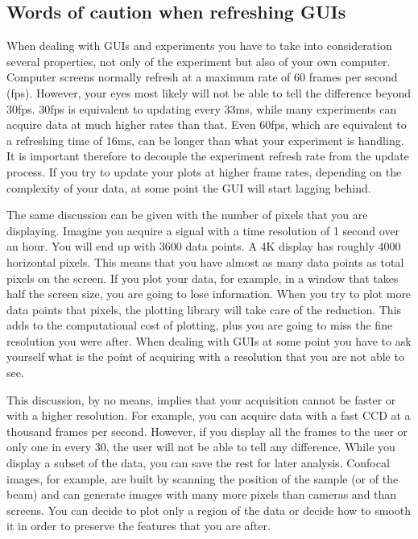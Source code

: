 \subsection{Words of caution when refreshing GUIs}\label{words-of-caution-when-refreshingguis}
When dealing with GUIs and experiments you have to take into
consideration several properties, not only of the experiment but also of
your own computer. Computer screens normally refresh at a maximum rate
of 60 frames per second (fps). However, your eyes most likely will not
be able to tell the difference beyond 30fps. 30fps is equivalent to
updating every 33ms, while many experiments can acquire data at much
higher rates than that. Even 60fps, which are equivalent to a refreshing
time of 16ms, can be longer than what your experiment is handling. It is
important therefore to decouple the experiment refresh rate from the
update process. If you try to update your plots at higher frame rates,
depending on the complexity of your data, at some point the {GUI} will
start lagging behind.

The same discussion can be given with the number of pixels that you are
displaying. Imagine you acquire a signal with a time resolution of 1
second over an hour. You will end up with 3600 data points. A 4K display
has roughly 4000 horizontal pixels. This means that you have almost as
many data points as total pixels on the screen. If you plot your data,
for example, in a window that takes half the screen size, you are going
to lose information. When you try to plot more data points that pixels,
the plotting library will take care of the reduction. This adds to the
computational cost of plotting, plus you are going to miss the fine
resolution you were after. When dealing with GUIs at some point you have
to ask yourself what is the point of acquiring with a resolution that
you are not able to see.

This discussion, by no means, implies that your acquisition cannot be
faster or with a higher resolution. For example, you can acquire data
with a fast {CCD} at a thousand frames per second. However, if you display
all the frames to the user or only one in every 30, the user will not be
able to tell any difference. While you display a subset of the data, you
can save the rest for later analysis. Confocal images, for example, are
built by scanning the position of the sample (or of the beam) and can
generate images with many more pixels than cameras and than screens. You
can decide to plot only a region of the data or decide how to smooth it
in order to preserve the features that you are after.

